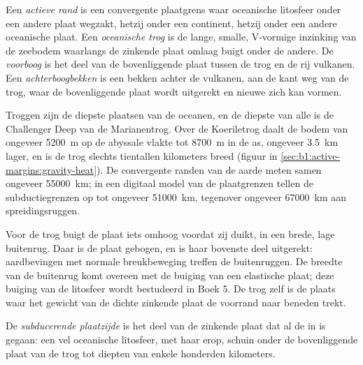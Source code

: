 \begin{definition}\label{def:b1:active-margins:active-margin}
Een \emph{actieve rand} is een convergente plaatgrens waar oceanische litosfeer onder een andere plaat wegzakt, hetzij onder een continent, hetzij onder een andere oceanische plaat. Een \emph{oceanische trog} is de lange, smalle, V-vormige inzinking van de zeebodem waarlangs de zinkende plaat omlaag buigt onder de andere. De \emph{voorboog} is het deel van de bovenliggende plaat tussen de trog en de rij vulkanen. Een \emph{achterboogbekken} is een bekken achter de vulkanen, aan de kant weg van de trog, waar de bovenliggende plaat wordt uitgerekt en nieuwe  zich kan vormen.
\end{definition}

Troggen zijn de diepste plaatsen van de oceanen, en de diepste van alle is de Challenger Deep van de Marianentrog. Over de Koeriletrog daalt de bodem van ongeveer \qty{5200}{m} op de abyssale vlakte tot \qty{8700}{m} in de as, ongeveer \qty{3.5}{km} lager, en is de trog slechts tientallen kilometers breed (figuur in \cref{sec:b1:active-margins:gravity-heat}). De convergente randen van de aarde meten samen ongeveer \qty{55000}{km}; in een digitaal model van de plaatgrenzen tellen de subductiegrenzen op tot ongeveer \qty{51000}{km}, tegenover ongeveer \qty{67000}{km} aan spreidingsruggen.

Voor de trog buigt de plaat iets omhoog voordat zij duikt, in een brede, lage buitenrug. Daar is de plaat gebogen, en is haar bovenste deel uitgerekt: aardbevingen met normale breukbeweging treffen de buitenruggen. De breedte van de buitenrug komt overeen met de buiging van een elastische plaat; deze buiging van de litosfeer wordt bestudeerd in Boek 5. De trog zelf is de plaats waar het gewicht van de dichte zinkende plaat de voorrand naar beneden trekt.

\begin{definition}\label{def:b1:active-margins:slab}
De \emph{subducerende plaatzijde} is het deel van de zinkende plaat dat al de  in is gegaan: een vel oceanische litosfeer, met haar  erop, schuin onder de bovenliggende plaat van de trog tot diepten van enkele honderden kilometers.
\end{definition}

